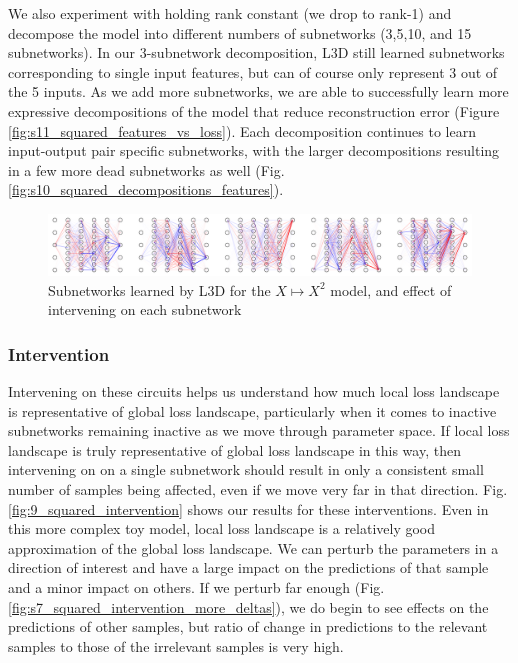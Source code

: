 \documentclass{article}
\theoremstyle{plain}
\theoremstyle{definition}
\theoremstyle{remark}
\begin{document}
We also experiment with holding rank constant (we drop to rank-1) and decompose the model into different numbers of subnetworks (3,5,10, and 15 subnetworks). In our 3-subnetwork decomposition, L3D still learned subnetworks corresponding to single input features, but can of course only represent 3 out of the 5 inputs. As we add more subnetworks, we are able to successfully learn more expressive decompositions of the model that reduce reconstruction error (Figure \ref{fig:s11_squared_features_vs_loss}). Each decomposition continues to learn input-output pair specific subnetworks, with the larger decompositions resulting in a few more dead subnetworks as well (Fig. \ref{fig:s10_squared_decompositions_features}).

\begin{figure}[htbp]
    \centerline{\includegraphics[width=\textwidth]{../figures/8_squared_subnetworks.pdf}}
    \centering
    \caption{Subnetworks learned by L3D for the $X \mapsto X^2$ model, and effect of intervening on each subnetwork}\label{fig:8_squared_subnetworks}
\end{figure}



\subsubsection{Intervention}

Intervening on these circuits helps us understand how much local loss landscape is representative of global loss landscape, particularly when it comes to inactive subnetworks remaining inactive as we move through parameter space. If local loss landscape is truly representative of global loss landscape in this way, then intervening on on a single subnetwork should result in only a consistent small number of samples being affected, even if we move very far in that direction. Fig. \ref{fig:9_squared_intervention} shows our results for these interventions. Even in this more complex toy model, local loss landscape is a relatively good approximation of the global loss landscape. We can perturb the parameters in a direction of interest and have a large impact on the predictions of that sample and a minor impact on others. If we perturb far enough (Fig. \ref{fig:s7_squared_intervention_more_deltas}), we do begin to see effects on the predictions of other samples, but ratio of change in predictions to the relevant samples to those of the irrelevant samples is very high.
\end{document}
